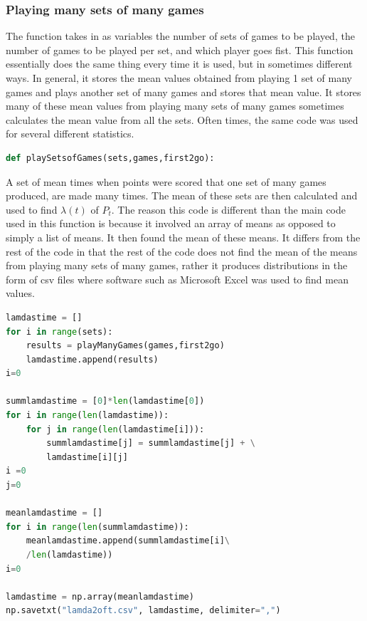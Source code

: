 \documentclass{article}
\begin{document}
\subsubsection{Playing many sets of many games}
The function takes in as variables the number of sets of games to be played, the number of games to be played per set, and which player goes fist. This function essentially does the same thing every time it is used, but in sometimes different ways. In general, it stores the mean values obtained from playing 1 set of many games and plays another set of many games and stores that mean value. It stores many of these mean values from playing many sets of many games sometimes calculates the mean value from all the sets. Often times, the same code was used for several different statistics. 
\begin{lstlisting}[language=Python]
def playSetsofGames(sets,games,first2go):
\end{lstlisting}

A set of mean times when points were scored that one set of many games produced, are made many times. The mean of these sets are then calculated and used to find $\lambda(t)$ of $P_t$. The reason this code is different than the main code used in this function is because it involved an array of means as opposed to simply a list of means. It then found the mean of these means. It differs from the rest of the code in that the rest of the code does not find the mean of the means from playing many sets of many games, rather it produces distributions in the form of csv files where software such as Microsoft Excel was used to find mean values.
\begin{lstlisting}[language=Python]
lamdastime = []
for i in range(sets):
    results = playManyGames(games,first2go)
    lamdastime.append(results)
i=0

summlamdastime = [0]*len(lamdastime[0])
for i in range(len(lamdastime)):
    for j in range(len(lamdastime[i])):
        summlamdastime[j] = summlamdastime[j] + \
        lamdastime[i][j]
i =0
j=0

meanlamdastime = []
for i in range(len(summlamdastime)):
    meanlamdastime.append(summlamdastime[i]\
    /len(lamdastime))
i=0

lamdastime = np.array(meanlamdastime)
np.savetxt("lamda2oft.csv", lamdastime, delimiter=",")
\end{lstlisting}
\end{document}
